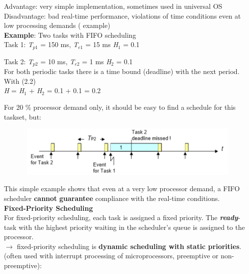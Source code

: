 Advantage:   very simple implementation, sometimes used in universal OS\\

Disadvantage:  bad real-time performance,        violations of time conditions even at low processing demands ( example)\\

\textbf{Example}: Two tasks with FIFO scheduling\\

Task 1: \textit{T}${}_{p1}$ = 150 ms, \textit{T}${}_{e1}$ = 15 ms   \textit{H}${}_{1}$ = 0.1

Task 2: \textit{T}${}_{p2}$ = 10 ms,  \textit{T}${}_{e2}$ = 1 ms    \textit{H}${}_{2}$ = 0.1\\

For both periodic tasks there is a time bound (deadline) with the next period. With (2.2) \\

\textit{H} = \textit{H}${}_{1}$ + \textit{H}${}_{2}$ = 0.1 + 0.1 = 0.2 

For 20 \% processor demand only, it should be easy to find a schedule for this taskset, but:

 	\begin{figure}[h]
    \centering
    \includegraphics[width=12cm, height=2.5cm]{Images/image98.png}
    \label{fig:Fig }
    \end{figure}

This simple example shows that even at a very low processor demand, a FIFO scheduler \textbf{cannot} \textbf{guarantee} compliance with the real-time conditions.\\

{\rot\bf Fixed-Priority Scheduling}\\

For fixed-priority scheduling, each task is assigned a fixed priority. The \textbf{\textit{ready}}-task with the highest priority waiting in the scheduler's queue is assigned to the processor.  \\
$\rightarrow$ fixed-priority scheduling is\textbf{ dynamic scheduling with static priorities}. (often used with interrupt processing of microprocessors, preemptive or non-preemptive):

